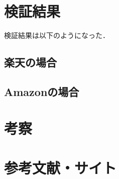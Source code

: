 \documentclass[dvipdfmx]{jsarticle}
\begin{document}
    \section{検証結果}
    検証結果は以下のようになった．
    \subsection{楽天の場合}

    \subsection{Amazonの場合}

    \section{考察}
    
    \section{参考文献・サイト}
\end{document}
